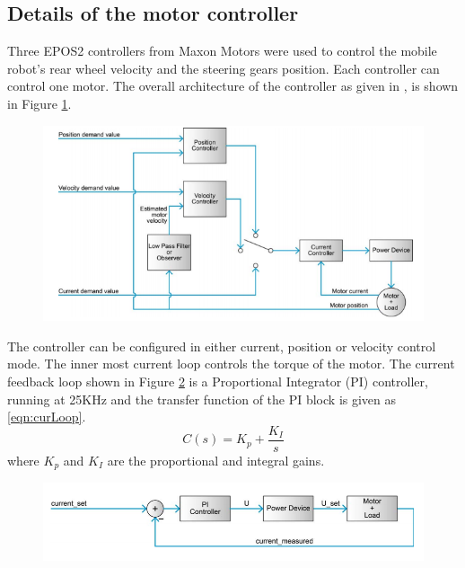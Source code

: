\subsection{Details of the motor controller}
Three EPOS2 controllers from Maxon Motors were used to control the mobile robot's rear wheel velocity and the steering gears position. Each controller can control one motor. The overall architecture of the controller  as given in \cite{maxonAutoTune}, \cite{maxonAppNotesPosition}  is shown  in  Figure \ref{fig:EPOS4}.
  \begin{figure}
	\includegraphics[width=\linewidth,keepaspectratio]{Chapter5/fig/overallcontorl}
	\label{fig:EPOS4} 
\end{figure}
 The controller can be configured in either current, position or velocity control mode. The inner most current loop controls the torque of the motor.
 The current feedback loop shown in Figure \ref{fig:curloop} is a Proportional Integrator (PI) controller, running at 25KHz and the transfer function of the PI block is given as \ref{eqn:curLoop}. 
 \begin{equation}
 	C(s)=K_p + \frac{K_I}{s}
 	\label{eqn:curLoop}
 \end{equation}
 where $K_p$ and $ K_I$ are the proportional and integral gains.
 
 
 \begin{figure}
 	\includegraphics[width=\linewidth,keepaspectratio]{Chapter5/fig/currentLoop}
 	\label{fig:curloop} 
 \end{figure}
 
